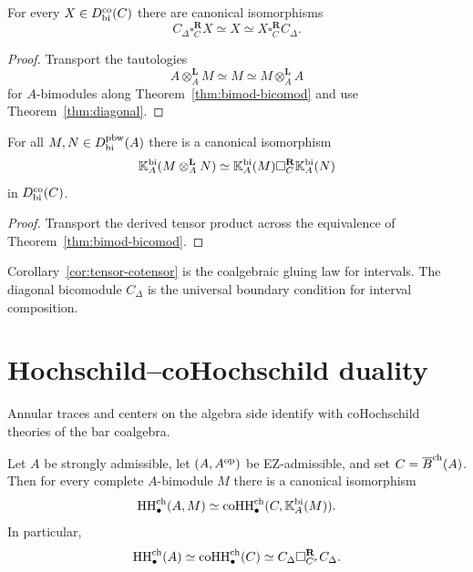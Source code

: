 \begin{corollary}
\label{cor:unit}
For every $X\in D^{\mathrm{co}}_{\mathrm{bi}}(C)$ there are canonical isomorphisms
\[
C_\Delta \square_C^{\mathbf R} X \simeq X \simeq X \square_C^{\mathbf R} C_\Delta.
\]
\end{corollary}

\begin{proof}
Transport the tautologies
\[
A\otimes_A^{\mathbf L} M\simeq M\simeq M\otimes_A^{\mathbf L} A
\]
for $A$-bimodules along Theorem~\ref{thm:bimod-bicomod} and use
Theorem~\ref{thm:diagonal}.
\end{proof}

\begin{corollary}
\label{cor:tensor-cotensor}
For all $M,N\in D^{\mathrm{pbw}}_{\mathrm{bi}}(A)$ there is a canonical isomorphism
\[
\mathbb{K}_A^{\mathrm{bi}}(M\otimes_A^{\mathbf L} N)
\simeq
\mathbb{K}_A^{\mathrm{bi}}(M)\square_C^{\mathbf R}\mathbb{K}_A^{\mathrm{bi}}(N)
\]
in $D^{\mathrm{co}}_{\mathrm{bi}}(C)$.
\end{corollary}

\begin{proof}
Transport the derived tensor product across the equivalence of
Theorem~\ref{thm:bimod-bicomod}.
\end{proof}

\begin{remark}
Corollary~\ref{cor:tensor-cotensor} is the coalgebraic gluing law
for intervals. The diagonal bicomodule $C_\Delta$ is the universal
boundary condition for interval composition.
\end{remark}

\section{Hochschild--coHochschild duality}
\label{sec:HH-coHH}

Annular traces and centers on the algebra side identify with
coHochschild theories of the bar coalgebra.

\begin{theorem}
\label{thm:HH-coHH-homology}
Let $A$ be strongly admissible, let $(A,A^{\mathrm{op}})$ be EZ-admissible, and set $C=\overline{B}^{\mathrm{ch}}(A)$.
Then for every complete $A$-bimodule $M$ there is a canonical isomorphism
\[
\operatorname{HH}^{\mathrm{ch}}_\bullet(A,M)\simeq
\operatorname{coHH}^{\mathrm{ch}}_\bullet(C,\mathbb{K}_A^{\mathrm{bi}}(M)).
\]
In particular,
\[
\operatorname{HH}^{\mathrm{ch}}_\bullet(A)\simeq \operatorname{coHH}^{\mathrm{ch}}_\bullet(C)
\simeq
C_\Delta \square_{C^e}^{\mathbf R} C_\Delta.
\]
\end{theorem}

